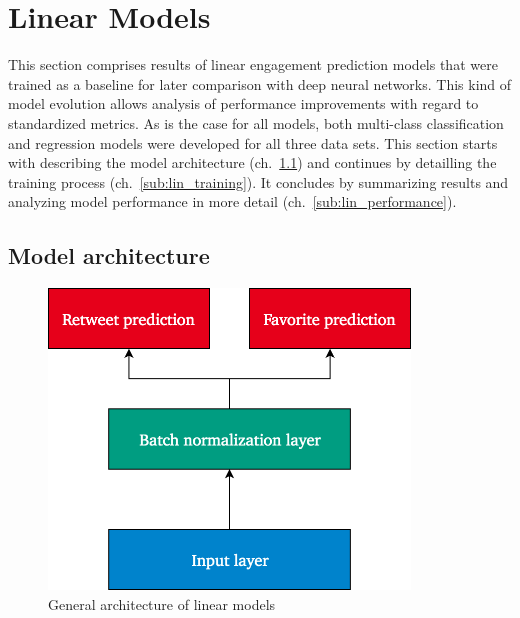 \section{Linear Models}
\label{sec:linear_models}

This section comprises results of linear engagement prediction models that
were trained as a baseline for later comparison with deep neural networks.
This kind of model evolution allows analysis of performance improvements
with regard to standardized metrics.
As is the case for all models, both multi-class classification and regression
models were developed for all three data sets.
This section starts with describing the model architecture (ch.~\ref{sub:lin_architecture}) and continues by detailling the training process (ch.~\ref{sub:lin_training}).
It concludes by summarizing results and analyzing model performance in more detail
(ch.~\ref{sub:lin_performance}).

\subsection{Model architecture}
\label{sub:lin_architecture}

\begin{figure}[h]
  \centering
  \includegraphics[height=8cm]{img/linear_model_architecture}
  \caption{General architecture of linear models}
\label{fig:linear_model_architecture}
\end{figure}

